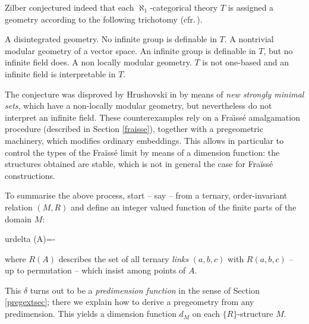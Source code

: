 Zilber conjectured indeed that each $\aleph_{1}$-categorical theory $T$ is assigned a geometry according to the following trichotomy
(cfr.\,\cite{hruabi,jbg}).
\begin{itemize}
A disintegrated geometry. No infinite %
group is definable in $T$.
A nontrivial modular geometry of a vector space. An infinite %
group is definable in $T$, but no infinite field does.
A non locally modular geometry. $T$ is not one-based and an infinite field is interpretable
in $T$.
\end{itemize}

The conjecture was disproved by Hrushovski in \cite{hruabi} by means of {\em new strongly minimal sets},
which have a non-locally modular geometry, but nevertheless do not interpret an infinite field.
These counterexamples rely on a Fra\"{\i}ss\'e amalgamation procedure (described in Section \ref{fraisse}), together with
a pregeometric machinery, which modifies ordinary embeddings. This allows in particular
to control the types of the Fra\"iss\'e limit by means of a dimension function: the
structures obtained are stable, which is not in general the case for Fra\"iss\'e constructions.

\smallskip
To summarise the above process, start -- say -- from a ternary, order-invariant relation $(M,R)$
and define an integer valued function of the finite parts of the domain $M$:
\begin{labeq}{urdelta}
\delta(A)=-
\end{labeq}
where $R(A)$ describes the set of all ternary {\em links} $(a,b,c)$ with $R(a,b,c)$ -- up to permutation -- which insist among
points of $A$.

This $\delta$ turns out to be a {\em predimension function} in the sense of Section
\ref{pregextsec}; there we explain how to derive a pregeometry from any predimension.
This yields a dimension function $d_{M}$ on each $\{R\}$-structure $M$.

